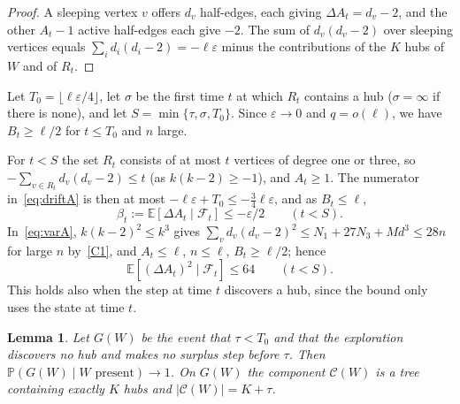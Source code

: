 \documentclass[11pt]{amsart}
\newtheorem{lemma}[theorem]{Lemma}
\theoremstyle{definition}
\theoremstyle{remark}
\numberwithin{equation}{section}
\newcommand{\PP}{\mathbb P}
\newcommand{\E}{\mathbb E}
\newcommand{\eps}{\varepsilon}
\newcommand{\cF}{\mathcal F}
\newcommand{\cC}{\mathcal C}
\begin{document}
\begin{proof}
A sleeping vertex $v$ offers $d_v$ half-edges, each giving $\Delta A_t=d_v-2$, and the other $A_t-1$ active half-edges each give $-2$. The sum of $d_v(d_v-2)$ over sleeping vertices equals $\sum_id_i(d_i-2)=-\ell\eps$ minus the contributions of the $K$ hubs of $W$ and of $R_t$.
\end{proof}

Let $T_0=\lfloor\ell\eps/4\rfloor$, let $\sigma$ be the first time $t$ at which $R_t$ contains a hub ($\sigma=\infty$ if there is none), and let $S=\min\{\tau,\sigma,T_0\}$. Since $\eps\to0$ and $q=o(\ell)$, we have $B_t\ge\ell/2$ for $t\le T_0$ and $n$ large.

For $t<S$ the set $R_t$ consists of at most $t$ vertices of degree one or three, so $-\sum_{v\in R_t}d_v(d_v-2)\le t$ (as $k(k-2)\ge-1$), and $A_t\ge1$. The numerator in~\eqref{eq:driftA} is then at most $-\ell\eps+T_0\le-\tfrac34\ell\eps$, and as $B_t\le\ell$,
\begin{equation}\label{eq:betaneg}
\beta_t:=\E[\Delta A_t\mid\cF_t]\le-\eps/2\qquad(t<S).
\end{equation}
In~\eqref{eq:varA}, $k(k-2)^2\le k^3$ gives $\sum_{v}d_v(d_v-2)^2\le N_1+27N_3+Md^3\le28n$ for large $n$ by~\ref{C1}, and $A_t\le\ell$, $n\le\ell$, $B_t\ge\ell/2$; hence
\begin{equation}\label{eq:varbound}
\E[(\Delta A_t)^2\mid\cF_t]\le64\qquad(t<S).
\end{equation}
This holds also when the step at time $t$ discovers a hub, since the bound only uses the state at time $t$.

\begin{lemma}\label{lem:good}
Let $G(W)$ be the event that $\tau<T_0$ and that the exploration discovers no hub and makes no surplus step before $\tau$. Then $\PP(G(W)\mid W\text{ present})\to1$. On $G(W)$ the component $\cC(W)$ is a tree containing exactly $K$ hubs and $|\cC(W)|=K+\tau$.
\end{lemma}
\end{document}
